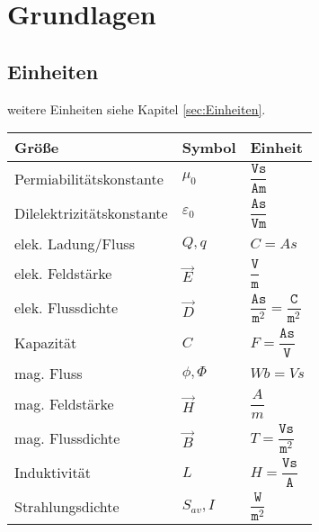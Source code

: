 \section{Grundlagen}
\subsection{Einheiten}
weitere Einheiten siehe Kapitel \ref{sec:Einheiten}.
\begin{table}[H]
	\renewcommand{\arraystretch}{2.15}
	\begin{tabularx}{0.9\columnwidth}{lXl}
		Größe                     & Symbol          & Einheit                                                              \\
		\hline
		Permiabilitätskonstante   & $\mu_0$         & $\dfrac{\texttt{Vs}}{\texttt{Am}}$                                   \\
		\hline
		Dilelektrizitätskonstante & $\varepsilon_0$ & $\dfrac{\texttt{As}}{\texttt{Vm}}$                                   \\
		\hline
		elek. Ladung/Fluss        & $ Q, q $        & $ C=As $                                                             \\
		\hline
		elek. Feldstärke          & $ \vec{E} $     & $\dfrac{\texttt{V}}{\texttt{m}}$                                     \\
		\hline
		elek. Flussdichte         & $ \vec{D} $     & $\dfrac{\texttt{As}}{\texttt{m}^2}=\dfrac{\texttt{C}}{\texttt{m}^2}$ \\
		\hline
		Kapazität                 & $C$             & $F= \dfrac{\texttt{As}}{\texttt{V}}$                                 \\
		\hline
		mag. Fluss                & $\phi, \Phi$    & $Wb = Vs$                                                            \\
		\hline
		mag. Feldstärke           & $\vec{H}$       & $\dfrac{A}{m}$                                                       \\
		\hline
		mag. Flussdichte          & $\vec{B}$       & $T = \dfrac{\texttt{Vs}}{\texttt{m}^2}$                              \\
		\hline
		Induktivität              & $L$             & $H = \dfrac{\texttt{Vs}}{\texttt{A}}$                                \\
		\hline
		Strahlungsdichte          & $S_{av}, I$     & $\dfrac{\texttt{W}}{\texttt{m}^2}$                                   \\
	\end{tabularx}
\end{table}

